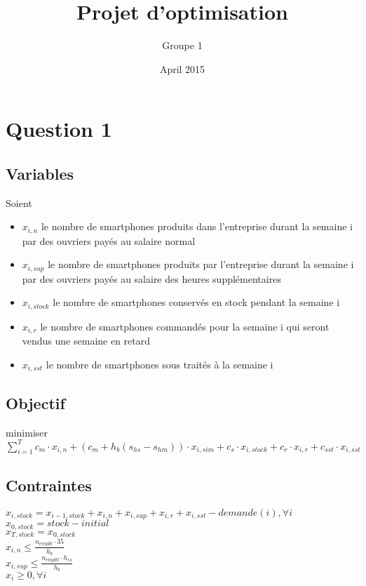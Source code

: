 \documentclass{article}
\title{Projet d'optimisation}
\author{Groupe 1}
\date{April 2015}
\begin{document}
\maketitle

\section{Question 1}

\subsection*{Variables}
Soient 
\begin{itemize}
\item $x_{i,n}$ le nombre de smartphones produits dans l'entreprise durant la semaine i par des ouvriers payés au salaire normal
\item $x_{i,sup}$ le nombre de smartphones produits par l'entreprise durant la semaine i par des ouvriers payés au salaire des heures supplémentaires

\item $x_{i,stock}$ le nombre de smartphones conservés en stock pendant la semaine i
\item $x_{i,r}$ le nombre de smartphones commandés pour la semaine i qui seront vendus une semaine en retard
\item $x_{i,sst}$ le nombre de smartphones sous traités à la semaine i
\end{itemize}

\subsection*{Objectif}

minimiser $\sum_{i=1}^{T} c_m \cdot x_{i,n} + (c_m + h_b (s_{hs} - s_{hm})) \cdot x_{i,sim} + c_s \cdot x_{i,stock} + c_r \cdot x_{i,r} + c_{sst} \cdot x_{i,sst} $

\subsection*{Contraintes}

$x_{i,stock} = x_{i-1,stock} + x_{i,n} + x_{i,sup} + x_{i,r} + x_{i,sst} - demande(i), \forall i$ \\
$x_{0, stock} = stock-initial$ \\
$x_{T, stock} = x_{0, stock}$ \\
$x_{i,n} \leq \frac{n_{empl0} \cdot 35}{h_b}$ \\
$x_{i,sup} \leq \frac{n_{empl0} \cdot h_{ss}}{h_{b}}$ \\
$x_i \geq 0, \forall i$ \\
\end{document}
